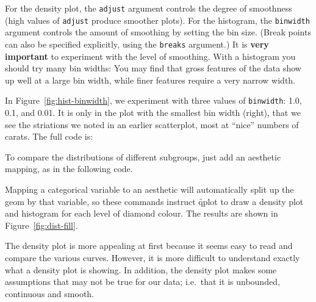 For the density plot, the {\tt adjust} argument controls the degree of smoothness (high values of {\tt adjust} produce smoother plots). For the histogram, the {\tt binwidth} argument controls the amount of smoothing by setting the bin size.  (Break points can also be specified explicitly, using the {\tt breaks} argument.) It is {\bf very important} to experiment with the level of smoothing.  With a histogram you should try many bin widths: You may find that gross features of the data show up well at a large bin width, while finer features require a very narrow width.

In Figure~\ref{fig:hist-binwidth}, we experiment with three values of {\tt binwidth}: 1.0, 0.1, and 0.01.  It is only in the plot with the smallest bin width (right), that we see the striations we noted in an earlier scatterplot, most at ``nice'' numbers of carats. The full code is:

% 


To compare the distributions of different subgroups, just add an aesthetic mapping, as in the following code.

% 


\noindent Mapping a categorical variable to an aesthetic will automatically split up the geom by that variable, so these commands instruct \f{qplot} to draw a density plot and histogram for each level of diamond colour. The results are shown in Figure~\ref{fig:dist-fill}.  

The density plot is more appealing at first because it seems easy to read and compare the various curves. However, it is more difficult to understand exactly what a density plot is showing.  In addition, the density plot makes some assumptions that may not be true for our data; i.e.\ that it is unbounded, continuous and smooth.

